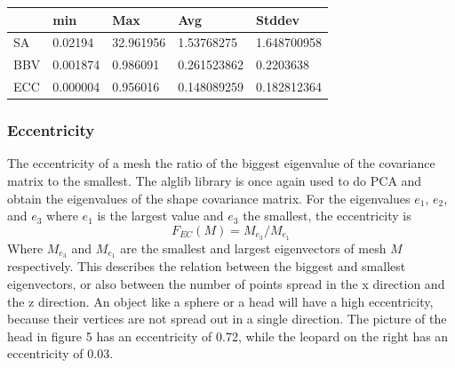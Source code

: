 \documentclass{bigdata}
\begin{document}
\begin{center}
    \begin{tabular}{ | l | l | l | l | l |}
    \hline
    & min & Max & Avg & Stddev \\ \hline
    SA & 0.02194 & 32.961956 & 1.53768275 & 1.648700958 \\ \hline
    BBV & 0.001874 & 0.986091 & 0.261523862 & 0.2203638 \\ \hline
    ECC & 0.000004 & 0.956016 & 0.148089259 & 0.182812364 \\ \hline

    \end{tabular}
\end{center}

\subsubsection{Eccentricity}
The eccentricity of a mesh the ratio of the biggest eigenvalue of the covariance matrix to the smallest. The alglib library is once again used to do PCA and obtain the eigenvalues of the shape covariance matrix. For the eigenvalues $e_1$, $e_2$, and $e_3$ where $e_1$ is the largest value and $e_3$ the smallest, the eccentricity is
\begin{equation}
F_{EC}(M) = M_{e_3} / M_{e_1}
\end{equation}
Where $M_{e_3}$ and $M_{e_1}$ are the smallest and largest eigenvectors of mesh $M$ respectively. This describes the relation between the biggest and smallest eigenvectors, or also between the number of points spread in the x direction and the z direction. An object like a sphere or a head will have a high eccentricity, because their vertices are not spread out in a single direction. The picture of the head in figure 5 has an eccentricity of 0.72, while the leopard on the right has an eccentricity of 0.03.
\end{document}
